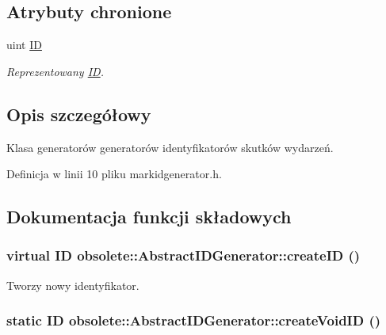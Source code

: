 \subsection*{Atrybuty chronione}
\begin{DoxyCompactItemize}
\item 
uint \hyperlink{classobsolete_1_1AbstractID_a5f67fa1c7d96085f0ef41193b60b570c}{ID}
\begin{DoxyCompactList}\small\item\em Reprezentowany \hyperlink{classobsolete_1_1ID}{ID}. \item\end{DoxyCompactList}\end{DoxyCompactItemize}


\subsection{Opis szczegółowy}
Klasa generatorów generatorów identyfikatorów skutków wydarzeń. 

Definicja w linii 10 pliku markidgenerator.h.



\subsection{Dokumentacja funkcji składowych}
\hypertarget{classobsolete_1_1AbstractIDGenerator_a39d2f0147e3a028fef8299770e23db90}{
\subsubsection[{createID}]{\setlength{\rightskip}{0pt plus 5cm}virtual {\bf ID} obsolete::AbstractIDGenerator::createID ()}}
\label{classobsolete_1_1AbstractIDGenerator_a39d2f0147e3a028fef8299770e23db90}


Tworzy nowy identyfikator. 

\hypertarget{classobsolete_1_1AbstractIDGenerator_a330da88ba80820ca6ce0a29cbbab9e1b}{
\subsubsection[{createVoidID}]{\setlength{\rightskip}{0pt plus 5cm}static {\bf ID} obsolete::AbstractIDGenerator::createVoidID ()}}
\label{classobsolete_1_1AbstractIDGenerator_a330da88ba80820ca6ce0a29cbbab9e1b}


